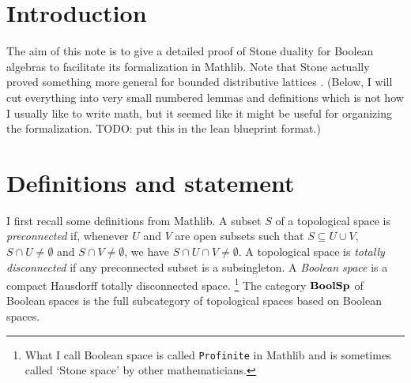 %


\newcommand{\docref}[3]{}

\chapter{Introduction}

The aim of this note is to give a detailed proof of Stone duality for Boolean
algebras \cite{Sto1937BA} to facilitate its formalization in Mathlib. Note that
Stone actually proved something more general for bounded distributive lattices
\cite{Sto1937}. (Below, I will cut everything into very small numbered lemmas
and definitions which is not how I usually like to write math, but it seemed
like it might be useful for organizing the formalization. TODO: put this in the
lean blueprint format.)

\chapter{Definitions and statement}
I first recall some definitions from Mathlib. A subset $S$ of a topological
space is \emph{preconnected} if, whenever $U$ and $V$ are open subsets such
that $S \subseteq U \cup V$, $S \cap U \neq \emptyset$ and $S \cap V \neq
\emptyset$, we have $S \cap U \cap V \neq \emptyset$. A topological space is
\emph{totally disconnected} if any preconnected subset is a subsingleton. 
A \emph{Boolean space} is a compact Hausdorff totally disconnected space.%
\footnote{What I call Boolean space is called \texttt{Profinite} in Mathlib and
is sometimes called `Stone space' by other mathematicians.} The category
$\mathbf{BoolSp}$ of Boolean spaces is the full subcategory of topological spaces based
on Boolean spaces.

